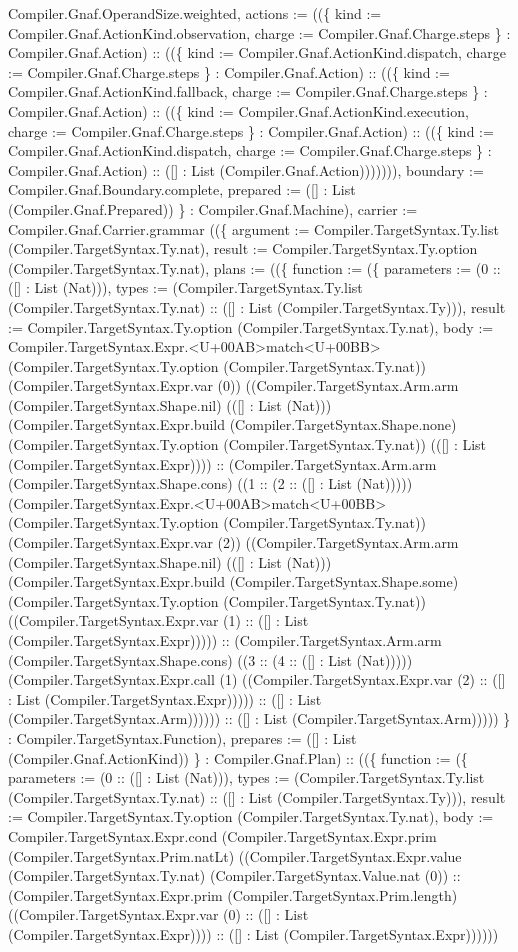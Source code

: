 \documentclass[11pt]{article}
\begin{document}
Compiler.Gnaf.OperandSize.weighted, actions := ((\{ kind := Compiler.Gnaf.ActionKind.observation, charge := Compiler.Gnaf.Charge.steps \} : Compiler.Gnaf.Action) :: ((\{ kind := Compiler.Gnaf.ActionKind.dispatch, charge := Compiler.Gnaf.Charge.steps \} : Compiler.Gnaf.Action) :: ((\{ kind := Compiler.Gnaf.ActionKind.fallback, charge := Compiler.Gnaf.Charge.steps \} : Compiler.Gnaf.Action) :: ((\{ kind := Compiler.Gnaf.ActionKind.execution, charge := Compiler.Gnaf.Charge.steps \} : Compiler.Gnaf.Action) :: ((\{ kind := Compiler.Gnaf.ActionKind.dispatch, charge := Compiler.Gnaf.Charge.steps \} : Compiler.Gnaf.Action) :: ([] : List (Compiler.Gnaf.Action))))))), boundary := Compiler.Gnaf.Boundary.complete, prepared := ([] : List (Compiler.Gnaf.Prepared)) \} : Compiler.Gnaf.Machine), carrier := Compiler.Gnaf.Carrier.grammar ((\{ argument := Compiler.TargetSyntax.Ty.list (Compiler.TargetSyntax.Ty.nat), result := Compiler.TargetSyntax.Ty.option (Compiler.TargetSyntax.Ty.nat), plans := ((\{ function := (\{ parameters := (0 :: ([] : List (Nat))), types := (Compiler.TargetSyntax.Ty.list (Compiler.TargetSyntax.Ty.nat) :: ([] : List (Compiler.TargetSyntax.Ty))), result := Compiler.TargetSyntax.Ty.option (Compiler.TargetSyntax.Ty.nat), body := Compiler.TargetSyntax.Expr.<U+00AB>match<U+00BB> (Compiler.TargetSyntax.Ty.option (Compiler.TargetSyntax.Ty.nat)) (Compiler.TargetSyntax.Expr.var (0)) ((Compiler.TargetSyntax.Arm.arm (Compiler.TargetSyntax.Shape.nil) (([] : List (Nat))) (Compiler.TargetSyntax.Expr.build (Compiler.TargetSyntax.Shape.none) (Compiler.TargetSyntax.Ty.option (Compiler.TargetSyntax.Ty.nat)) (([] : List (Compiler.TargetSyntax.Expr)))) :: (Compiler.TargetSyntax.Arm.arm (Compiler.TargetSyntax.Shape.cons) ((1 :: (2 :: ([] : List (Nat))))) (Compiler.TargetSyntax.Expr.<U+00AB>match<U+00BB> (Compiler.TargetSyntax.Ty.option (Compiler.TargetSyntax.Ty.nat)) (Compiler.TargetSyntax.Expr.var (2)) ((Compiler.TargetSyntax.Arm.arm (Compiler.TargetSyntax.Shape.nil) (([] : List (Nat))) (Compiler.TargetSyntax.Expr.build (Compiler.TargetSyntax.Shape.some) (Compiler.TargetSyntax.Ty.option (Compiler.TargetSyntax.Ty.nat)) ((Compiler.TargetSyntax.Expr.var (1) :: ([] : List (Compiler.TargetSyntax.Expr))))) :: (Compiler.TargetSyntax.Arm.arm (Compiler.TargetSyntax.Shape.cons) ((3 :: (4 :: ([] : List (Nat))))) (Compiler.TargetSyntax.Expr.call (1) ((Compiler.TargetSyntax.Expr.var (2) :: ([] : List (Compiler.TargetSyntax.Expr))))) :: ([] : List (Compiler.TargetSyntax.Arm)))))) :: ([] : List (Compiler.TargetSyntax.Arm))))) \} : Compiler.TargetSyntax.Function), prepares := ([] : List (Compiler.Gnaf.ActionKind)) \} : Compiler.Gnaf.Plan) :: ((\{ function := (\{ parameters := (0 :: ([] : List (Nat))), types := (Compiler.TargetSyntax.Ty.list (Compiler.TargetSyntax.Ty.nat) :: ([] : List (Compiler.TargetSyntax.Ty))), result := Compiler.TargetSyntax.Ty.option (Compiler.TargetSyntax.Ty.nat), body := Compiler.TargetSyntax.Expr.cond (Compiler.TargetSyntax.Expr.prim (Compiler.TargetSyntax.Prim.natLt) ((Compiler.TargetSyntax.Expr.value (Compiler.TargetSyntax.Ty.nat) (Compiler.TargetSyntax.Value.nat (0)) :: (Compiler.TargetSyntax.Expr.prim (Compiler.TargetSyntax.Prim.length) ((Compiler.TargetSyntax.Expr.var (0) :: ([] : List (Compiler.TargetSyntax.Expr)))) :: ([] : List (Compiler.TargetSyntax.Expr)))))) 
\end{document}
